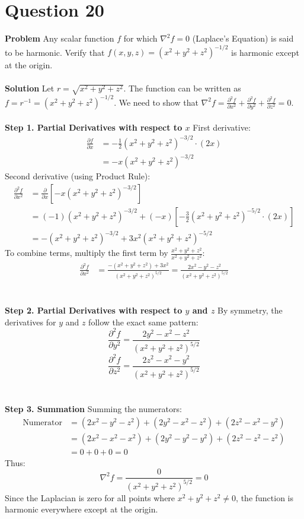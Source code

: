 \documentclass{article}
\begin{document}
\section{Question 20}
\textbf{Problem}
Any scalar function $f$ for which $\nabla^{2}f=0$ (Laplace's Equation) is said
to be harmonic. Verify that $f(x,y,z)=(x^{2}+y^{2}+z^{2})^{-1/2}$ is harmonic
except at the origin.
\\
\\
\textbf{Solution}
Let $r = \sqrt{x^2+y^2+z^2}$. The function can be written as
$f = r^{-1} = (x^2+y^2+z^2)^{-1/2}$.
We need to show that
$\nabla^2 f = \frac{\partial^2 f}{\partial x^2} + \frac{\partial^2 f}{\partial y^2} + \frac{\partial^2 f}{\partial z^2} = 0$.
\\
\\
\textbf{Step 1. Partial Derivatives with respect to $x$}
First derivative:
\begin{align*}
	\frac{\partial f}{\partial x} & = -\frac{1}{2}(x^2+y^2+z^2)^{-3/2} \cdot (2x) \\
	                              & = -x(x^2+y^2+z^2)^{-3/2}
\end{align*}
Second derivative (using Product Rule):
\begin{align*}
	\frac{\partial^2 f}{\partial x^2} & = \frac{\partial}{\partial x} \left[ -x(x^2+y^2+z^2)^{-3/2} \right]                          \\
	                                  & = (-1)(x^2+y^2+z^2)^{-3/2} + (-x) \left[ -\frac{3}{2}(x^2+y^2+z^2)^{-5/2} \cdot (2x) \right] \\
	                                  & = -(x^2+y^2+z^2)^{-3/2} + 3x^2(x^2+y^2+z^2)^{-5/2}
\end{align*}
To combine terms, multiply the first term by $\frac{x^2+y^2+z^2}{x^2+y^2+z^2}$:
\begin{align*}
	\frac{\partial^2 f}{\partial x^2} & = \frac{-(x^2+y^2+z^2) + 3x^2}{(x^2+y^2+z^2)^{5/2}} = \frac{2x^2 - y^2 - z^2}{(x^2+y^2+z^2)^{5/2}}
\end{align*}
\\
\\
\textbf{Step 2. Partial Derivatives with respect to $y$ and $z$}
By symmetry, the derivatives for $y$ and $z$ follow the exact same pattern:
\[
	\frac{\partial^2 f}{\partial y^2} = \frac{2y^2 - x^2 - z^2}{(x^2+y^2+z^2)^{5/2}}
\]
\[
	\frac{\partial^2 f}{\partial z^2} = \frac{2z^2 - x^2 - y^2}{(x^2+y^2+z^2)^{5/2}}
\]
\\
\\
\textbf{Step 3. Summation}
Summing the numerators:
\begin{align*}
	\text{Numerator} & = (2x^2 - y^2 - z^2) + (2y^2 - x^2 - z^2) + (2z^2 - x^2 - y^2) \\
	                 & = (2x^2 - x^2 - x^2) + (2y^2 - y^2 - y^2) + (2z^2 - z^2 - z^2) \\
	                 & = 0 + 0 + 0 = 0
\end{align*}
Thus:
\[
	\nabla^2 f = \frac{0}{(x^2+y^2+z^2)^{5/2}} = 0
\]
Since the Laplacian is zero for all points where $x^2+y^2+z^2 \neq 0$, the
function is harmonic everywhere except at the origin.
\end{document}
